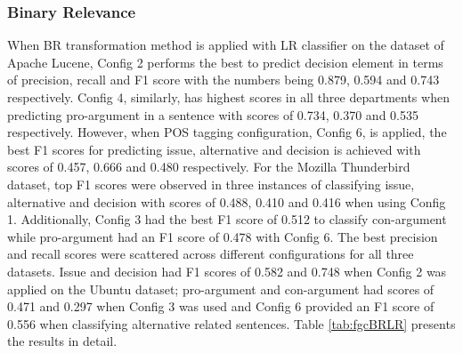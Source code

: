 \documentclass[a4paper,12pt,twoside]{report}
\begin{document}
\subsubsection{Binary Relevance}
When BR transformation method is applied with LR classifier on the dataset of Apache Lucene, Config 2 performs the best to predict decision element in terms of precision, recall and F1 score with the numbers being 0.879, 0.594 and 0.743 respectively. Config 4, similarly, has highest scores in all three departments when predicting pro-argument in a sentence with scores of 0.734, 0.370 and 0.535 respectively. However, when POS tagging configuration, Config 6, is applied, the best F1 scores for predicting issue, alternative and decision is achieved with scores of 0.457, 0.666 and 0.480 respectively. For the Mozilla Thunderbird dataset, top F1 scores were observed in three instances of classifying issue, alternative and decision with scores of 0.488, 0.410 and 0.416 when using Config 1. Additionally, Config 3 had the best F1 score of 0.512 to classify con-argument while pro-argument had an F1 score of 0.478 with Config 6. The best precision and recall scores were scattered across different configurations for all three datasets. Issue and decision had F1 scores of 0.582 and 0.748 when Config 2 was applied on the Ubuntu dataset; pro-argument and con-argument had scores of 0.471 and 0.297 when Config 3 was used and Config 6 provided an F1 score of 0.556 when classifying alternative related sentences. Table \ref{tab:fgcBRLR} presents the results in detail.
\end{document}

